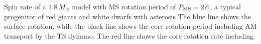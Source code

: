  \label{fig:MRI1.8rot} Spin rate of a $1.8 \, M_\odot$ model with MS rotation period of $P_{\rm MS} = 2 \, {\rm d}$, a typical progenitor of red giants and white dwarfs with asterosis The blue line shows the surface rotation, while the black line shows the core rotation period including AM transport by the TS dynamo. The red line shows the core rotation rate including
